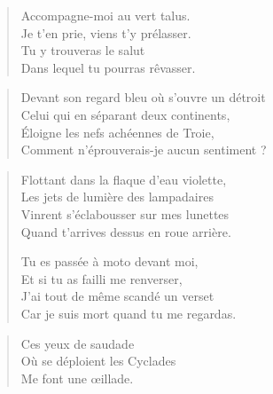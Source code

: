 \begin{verse}%
  \quatrain%
  Accompagne-moi au vert talus.\\  %
  Je t’en prie, viens t’y prélasser.\\  %
  Tu y trouveras le salut\\  %
  Dans lequel tu pourras rêvasser.
\end{verse}

\begin{verse}%
  \quatrain%
  Devant son regard bleu où s’ouvre un détroit\\  %
  Celui qui en séparant deux continents,\\  %
  Éloigne les nefs achéennes de Troie,\\  %
  Comment n’éprouverais-je aucun sentiment ?
\end{verse}

\begin{verse}%
  \quatrain%
  Flottant dans la flaque d’eau violette,\\  %
  Les jets de lumière des lampadaires\\  %
  Vinrent s’éclabousser sur mes lunettes\\  %
  Quand t’arrives dessus en roue arrière.

  Tu es passée à moto devant moi,\\  %
  Et si tu as failli me renverser,\\  %
  J’ai tout de même scandé un verset\\  %
  Car je suis mort quand tu me regardas.
\end{verse}

\begin{verse}%
  \haiku
  Ces yeux de saudade\\  %
  Où se déploient les Cyclades\\  %
  Me font une œillade.
\end{verse}

